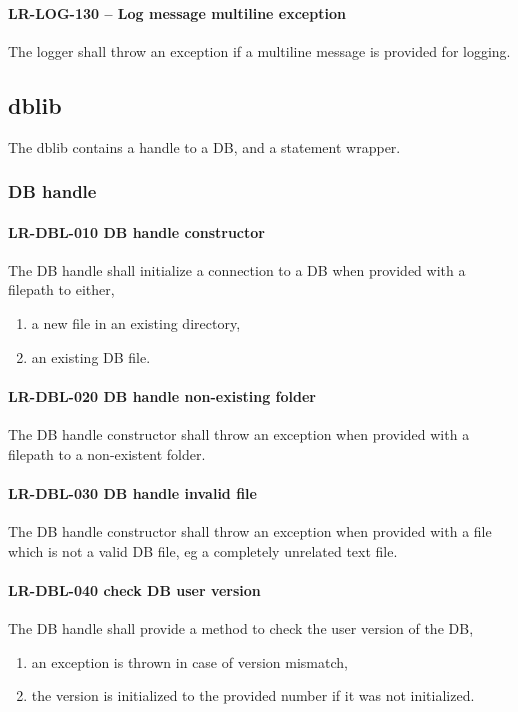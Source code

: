 \paragraph{LR-LOG-130 -- Log message multiline exception}
The logger shall throw an exception if a multiline message is provided
for logging.

\subsection{db\textunderscore lib}
The db\textunderscore lib contains a handle to a \gls{DB}, and a statement
wrapper.

\subsubsection{DB handle}
\paragraph{LR-DBL-010 DB handle constructor}
The DB handle shall initialize a connection to a DB when provided
with a filepath to either,
\begin{enumerate}
\item a new file in an existing directory,
\item an existing DB file.
\end{enumerate}

\paragraph{LR-DBL-020 DB handle non-existing folder}
The DB handle constructor shall throw an exception when provided with a filepath
to a non-existent folder.

\paragraph{LR-DBL-030 DB handle invalid file}
The DB handle constructor shall throw an exception when provided with a
file which is not a valid DB file, eg a completely unrelated text file.

\paragraph{LR-DBL-040 check DB user version}
The DB handle shall provide a method to check the user version of the DB,
\begin{enumerate}
\item an exception is thrown in case of version mismatch,
\item the version is initialized to the provided number if it was not
      initialized.
\end{enumerate}

